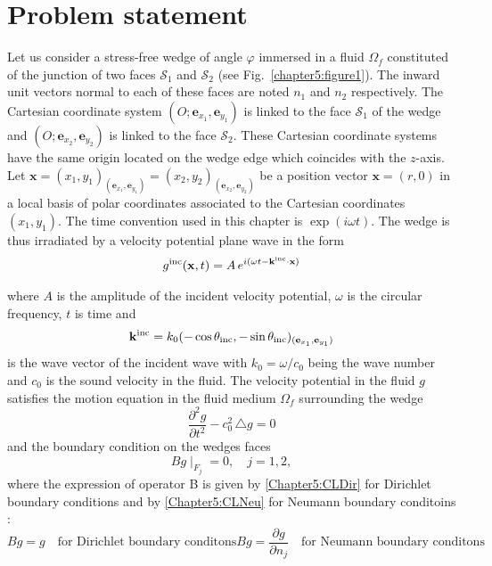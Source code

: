 \section{Problem statement}
\label{Chapter5:problem}

Let us consider a stress-free wedge of angle $\varphi$ immersed in a fluid $\Omega_f$ constituted of the junction of two faces $\mathcal{S}_1$ and $\mathcal{S}_2$ (see Fig.~\ref{chapter5:figure1}). The inward unit vectors normal to each of these faces are noted $n_1$ and $n_2$ respectively. The Cartesian coordinate system $(O; \mathbf{e}_{x_1}, \mathbf{e}_{y_1} )$ is linked to the face $\mathcal{S}_1$ of the wedge and $(O;  \mathbf{e}_{x_2}, \mathbf{e}_{y_2} )$ is linked to the face $\mathcal{S}_2$. These Cartesian coordinate systems  have the same origin located on the wedge edge which coincides with the $z$-axis. Let $\mathbf{x} = (x_1,y_1)_{ (\mathbf{e}_{x_1}, \mathbf{e}_{y_1}) } = (x_2,y_2)_{ (\mathbf{e}_{x_2}, \mathbf{e}_{y_2})}$ be a position vector $\mathbf{x} = (r,0)$ in a local basis of polar coordinates associated to the Cartesian coordinates $(x_1,y_1)$. The time convention used in this chapter is $\exp(i\omega t)$. The wedge is thus irradiated by a velocity potential plane wave in the form
\begin{align}
\label{Chapter5:incidence_wave}
g^{\rm inc}(\mathbf{x},t) = A \, e^{i(\omega t - \mathbf{k}^{\rm inc} \cdot \mathbf{x})}
\end{align}

where $A$ is the amplitude of the incident velocity potential, $\omega$ is the circular frequency, $t$ is time and 
\begin{align}
\mathbf{k}^{\rm inc} = k_0 (-\cos \theta_{\rm inc},-\sin \theta_{\rm inc})_{(\mathbf{e}_{x_1}, \mathbf{e}_{y_1})}
\end{align}
is the wave vector of the incident wave with $k_0 = \omega/c_0$ being the wave number and $c_0$ is the sound velocity in the fluid.  The velocity potential in the fluid $g$ satisfies the motion equation in the fluid medium $\Omega_f$ surrounding the wedge 
\begin{equation}
\label{Chapter5:WaveMotion}
\frac{\partial^2 g}{\partial t^2} - c_0^2 \, \triangle g = 0
\end{equation}
and the boundary condition on the wedges faces
\begin{equation}
\label{Chapter5:CL}
Bg\mid_{F_j} = 0, \quad j=1,2,
\end{equation}
where the expression of operator B is given by \eqref{Chapter5:CLDir} for Dirichlet boundary conditions and by \eqref{Chapter5:CLNeu} for Neumann boundary conditoins :
\begin{subequations}
\begin{equation}
\label{Chapter5:CLDir}
Bg = g \quad \mbox{for Dirichlet boundary conditons}
\end{equation}
\begin{equation}
\label{Chapter5:CLNeu}
Bg = \frac{\partial g}{\partial n_j} \quad \mbox{for Neumann boundary conditons}
\end{equation}
\end{subequations}

